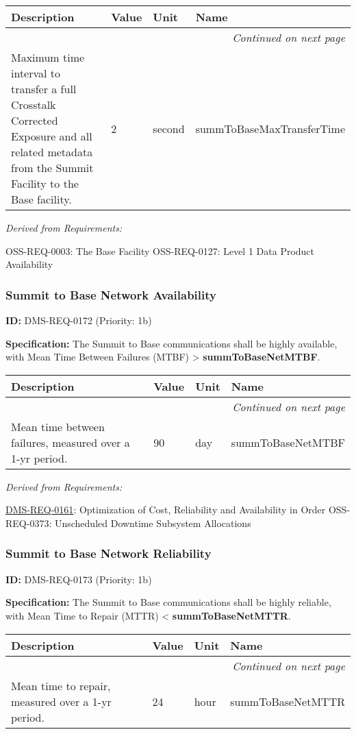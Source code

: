 \documentclass[SE,toc,lsstdraft]{lsstdoc}
\makeatletter
\newcommand{\paramname}[1]{\hspace{0pt}#1}
\newcommand{\unitname}[1]{\hspace{0pt}#1}
\newenvironment{parameters}[0]{%
\setlength\LTleft{0pt}
\setlength\LTright{\fill}
\begin{small}
\begin{longtable}[]{|p{0.49\textwidth}|l|p{0.6in}|p{1.70in}@{}|}

\hline \textbf{Description} & \textbf{Value} & \textbf{Unit} & \textbf{Name} \\ \hline
\endhead

\hline \multicolumn{4}{r}{\emph{Continued on next page}} \\
\endfoot

\hline\hline
\endlastfoot
}{%
\hline
\end{longtable}
\end{small}
}
\makeatother
\begin{document}
\begin{parameters}
Maximum time interval to transfer a full Crosstalk Corrected Exposure and all related metadata from the Summit Facility to the Base facility.
&
2
&
\unitname{%
second
}
&
\paramname{%
summToBaseMaxTransferTime
} \\\hline
\end{parameters}

\emph{Derived from Requirements:}

OSS-REQ-0003:
The Base Facility \newline
OSS-REQ-0127:
Level 1 Data Product Availability \newline

\subsubsection{Summit to Base Network Availability}

\label{DMS-REQ-0172}
\textbf{ID:} DMS-REQ-0172 (Priority: 1b)

\textbf{Specification:} The Summit to Base communications shall be highly available, with Mean Time Between Failures (MTBF) > \textbf{summToBaseNetMTBF}.

\begin{parameters}
Mean time between failures, measured over a 1-yr period.
&
90
&
\unitname{%
day
}
&
\paramname{%
summToBaseNetMTBF
} \\\hline
\end{parameters}

\emph{Derived from Requirements:}

\hyperref[DMS-REQ-0161]{DMS-REQ-0161}:
Optimization of Cost, Reliability and Availability in Order \newline
OSS-REQ-0373:
Unscheduled Downtime Subsystem Allocations \newline

\subsubsection{Summit to Base Network Reliability}

\label{DMS-REQ-0173}
\textbf{ID:} DMS-REQ-0173 (Priority: 1b)

\textbf{Specification:} The Summit to Base communications shall be highly reliable, with Mean Time to Repair (MTTR) < \textbf{summToBaseNetMTTR}.

\begin{parameters}
Mean time to repair, measured over a 1-yr period.
&
24
&
\unitname{%
hour
}
&
\paramname{%
summToBaseNetMTTR
} \\\hline
\end{parameters}
\end{document}
